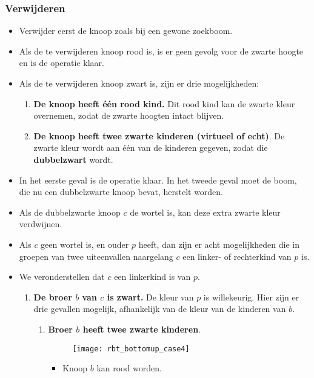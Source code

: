 \subsubsection{Verwijderen}
\begin{itemize}
    \item Verwijder eerst de knoop zoals bij een gewone zoekboom.
    \item Als de te verwijderen knoop rood is, is er geen gevolg voor de zwarte hoogte en is de operatie klaar.
    \item Als de te verwijderen knoop zwart is, zijn er drie mogelijkheden:
    \begin{enumerate}
        \item \textbf{De knoop heeft één rood kind.} Dit rood kind kan de zwarte kleur overnemen, zodat de zwarte hoogten intact blijven.
        \item \textbf{De knoop heeft twee zwarte kinderen (virtueel of echt)}. De zwarte kleur wordt aan één van de kinderen gegeven, zodat die \textbf{dubbelzwart} wordt.
    \end{enumerate}
    \item In het eerste geval is de operatie klaar. In het tweede geval moet de boom, die nu een dubbelzwarte knoop bevat, herstelt worden.
    \item Als de dubbelzwarte knoop $c$ de wortel is, kan deze extra zwarte kleur verdwijnen. 
    \item Als $c$ geen wortel is, en ouder $p$ heeft, dan zijn er acht mogelijkheden die in groepen van twee uiteenvallen naargelang $c$ een linker- of rechterkind van $p$ is.
    \item We veronderstellen dat $c$ een linkerkind is van $p$.
    \begin{enumerate}
        \item \textbf{De broer $b$ van $c$ is zwart.} De kleur van $p$ is willekeurig. Hier zijn er drie gevallen mogelijk, afhankelijk van de kleur van de kinderen van $b$.
        \begin{enumerate}
            \item \textbf{Broer $b$ heeft twee zwarte kinderen}.
            \begin{figure}[ht]
                \centering
                \texttt{[image: rbt\_bottomup\_case4]}
                \caption{}
                \label{fig:rbt_bottomup_case4}
            \end{figure}
            \begin{itemize}
                \item Knoop $b$ kan rood worden.

\end{itemize}
\end{enumerate}
\end{enumerate}
\end{itemize}
